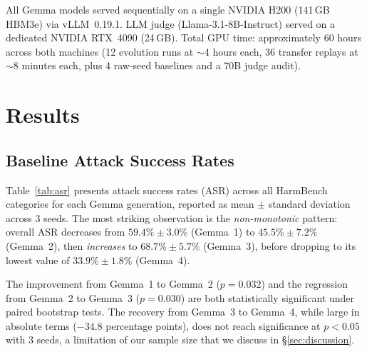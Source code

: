\documentclass{article}
\begin{document}
All Gemma models served sequentially on a single NVIDIA H200
(141\,GB HBM3e) via vLLM~0.19.1. LLM judge (Llama-3.1-8B-Instruct)
served on a dedicated NVIDIA RTX~4090 (24\,GB).
Total GPU time: approximately 60 hours across both machines
(12 evolution runs at $\sim$4 hours each, 36 transfer replays at
$\sim$8 minutes each, plus 4 raw-seed baselines and a 70B judge audit).

\section{Results}
\label{sec:results}

\subsection{Baseline Attack Success Rates}
\label{sec:results:baseline}

Table~\ref{tab:asr} presents attack success rates (ASR) across all
HarmBench categories for each Gemma generation, reported as mean $\pm$
standard deviation across 3 seeds. The most striking observation is
the \emph{non-monotonic} pattern: overall ASR decreases from
$59.4\% \pm 3.0\%$ (Gemma~1) to $45.5\% \pm 7.2\%$ (Gemma~2), then
\emph{increases} to $68.7\% \pm 5.7\%$ (Gemma~3), before dropping to
its lowest value of $33.9\% \pm 1.8\%$ (Gemma~4).

The improvement from Gemma~1 to Gemma~2 ($p = 0.032$) and the
regression from Gemma~2 to Gemma~3 ($p = 0.030$) are both statistically
significant under paired bootstrap tests. The recovery from Gemma~3 to
Gemma~4, while large in absolute terms ($-34.8$ percentage points),
does not reach significance at $p < 0.05$ with 3 seeds, a limitation
of our sample size that we discuss in \S\ref{sec:discussion}.
\end{document}
